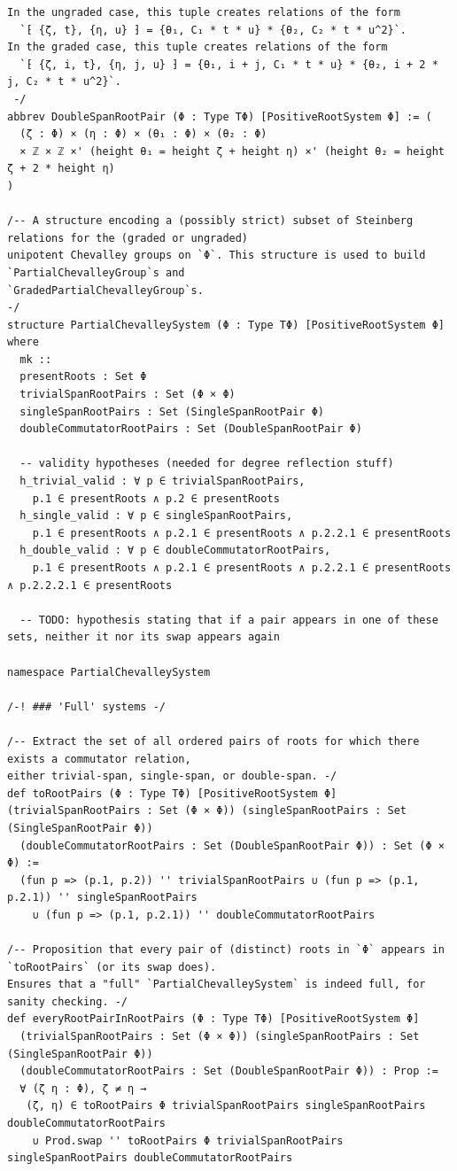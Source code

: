 \begin{Verbatim}
In the ungraded case, this tuple creates relations of the form
  `⁅ {ζ, t}, {η, u} ⁆ = {θ₁, C₁ * t * u} * {θ₂, C₂ * t * u^2}`.
In the graded case, this tuple creates relations of the form
  `⁅ {ζ, i, t}, {η, j, u} ⁆ = {θ₁, i + j, C₁ * t * u} * {θ₂, i + 2 * j, C₂ * t * u^2}`.
 -/
abbrev DoubleSpanRootPair (Φ : Type TΦ) [PositiveRootSystem Φ] := (
  (ζ : Φ) × (η : Φ) × (θ₁ : Φ) × (θ₂ : Φ)
  × ℤ × ℤ ×' (height θ₁ = height ζ + height η) ×' (height θ₂ = height ζ + 2 * height η)
)

/-- A structure encoding a (possibly strict) subset of Steinberg relations for the (graded or ungraded)
unipotent Chevalley groups on `Φ`. This structure is used to build `PartialChevalleyGroup`s and
`GradedPartialChevalleyGroup`s.
-/
structure PartialChevalleySystem (Φ : Type TΦ) [PositiveRootSystem Φ] where
  mk ::
  presentRoots : Set Φ
  trivialSpanRootPairs : Set (Φ × Φ)
  singleSpanRootPairs : Set (SingleSpanRootPair Φ)
  doubleCommutatorRootPairs : Set (DoubleSpanRootPair Φ)

  -- validity hypotheses (needed for degree reflection stuff)
  h_trivial_valid : ∀ p ∈ trivialSpanRootPairs,
    p.1 ∈ presentRoots ∧ p.2 ∈ presentRoots
  h_single_valid : ∀ p ∈ singleSpanRootPairs,
    p.1 ∈ presentRoots ∧ p.2.1 ∈ presentRoots ∧ p.2.2.1 ∈ presentRoots
  h_double_valid : ∀ p ∈ doubleCommutatorRootPairs,
    p.1 ∈ presentRoots ∧ p.2.1 ∈ presentRoots ∧ p.2.2.1 ∈ presentRoots ∧ p.2.2.2.1 ∈ presentRoots

  -- TODO: hypothesis stating that if a pair appears in one of these sets, neither it nor its swap appears again

namespace PartialChevalleySystem

/-! ### 'Full' systems -/

/-- Extract the set of all ordered pairs of roots for which there exists a commutator relation,
either trivial-span, single-span, or double-span. -/
def toRootPairs (Φ : Type TΦ) [PositiveRootSystem Φ] (trivialSpanRootPairs : Set (Φ × Φ)) (singleSpanRootPairs : Set (SingleSpanRootPair Φ))
  (doubleCommutatorRootPairs : Set (DoubleSpanRootPair Φ)) : Set (Φ × Φ) :=
  (fun p => (p.1, p.2)) '' trivialSpanRootPairs ∪ (fun p => (p.1, p.2.1)) '' singleSpanRootPairs
    ∪ (fun p => (p.1, p.2.1)) '' doubleCommutatorRootPairs

/-- Proposition that every pair of (distinct) roots in `Φ` appears in `toRootPairs` (or its swap does).
Ensures that a "full" `PartialChevalleySystem` is indeed full, for sanity checking. -/
def everyRootPairInRootPairs (Φ : Type TΦ) [PositiveRootSystem Φ]
  (trivialSpanRootPairs : Set (Φ × Φ)) (singleSpanRootPairs : Set (SingleSpanRootPair Φ))
  (doubleCommutatorRootPairs : Set (DoubleSpanRootPair Φ)) : Prop :=
  ∀ (ζ η : Φ), ζ ≠ η →
   (ζ, η) ∈ toRootPairs Φ trivialSpanRootPairs singleSpanRootPairs doubleCommutatorRootPairs
    ∪ Prod.swap '' toRootPairs Φ trivialSpanRootPairs singleSpanRootPairs doubleCommutatorRootPairs


\end{Verbatim}
